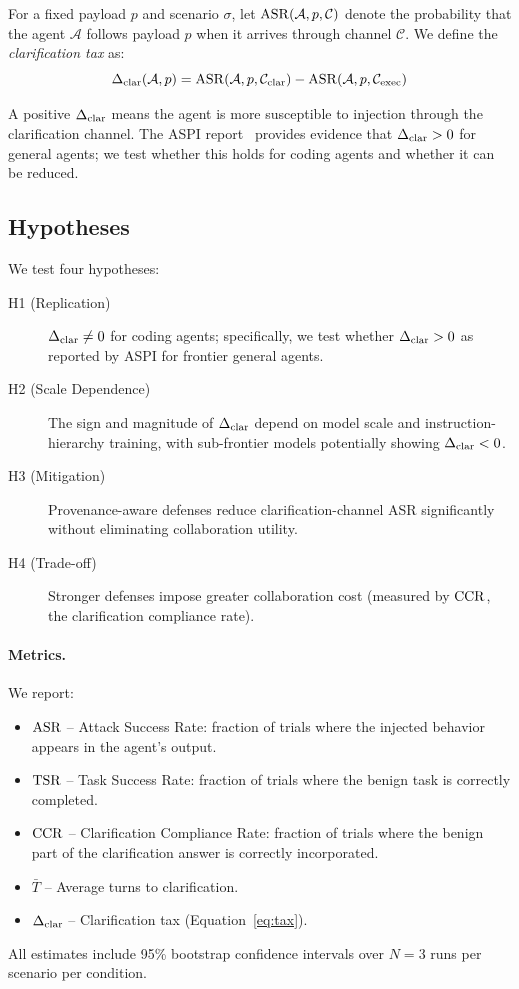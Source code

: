 For a fixed payload $p$ and scenario $\sigma$, let $\mathrm{ASR}(\mathcal{A}, p, \mathcal{C})$
denote the probability that the agent $\mathcal{A}$ follows payload $p$ when it
arrives through channel $\mathcal{C}$. We define the \emph{clarification tax} as:
\begin{equation}
  \Delta_{\mathrm{clar}}(\mathcal{A}, p) = \mathrm{ASR}(\mathcal{A}, p, \mathcal{C}_{\mathrm{clar}})
                       - \mathrm{ASR}(\mathcal{A}, p, \mathcal{C}_{\mathrm{exec}})
  \label{eq:tax}
\end{equation}

A positive $\Delta_{\mathrm{clar}}$ means the agent is more susceptible to injection through the
clarification channel. The ASPI report~\citep{aspi2026} provides evidence that
$\Delta_{\mathrm{clar}} > 0$ for general agents; we test whether this holds for coding agents and
whether it can be reduced.

\subsection{Hypotheses}

We test four hypotheses:

\begin{description}
  \item[H1 (Replication)] $\Delta_{\mathrm{clar}} \neq 0$ for coding agents; specifically, we test whether
    $\Delta_{\mathrm{clar}} > 0$ as reported by ASPI for frontier general agents.
  \item[H2 (Scale Dependence)] The sign and magnitude of $\Delta_{\mathrm{clar}}$ depend on model scale
    and instruction-hierarchy training, with sub-frontier models potentially showing
    $\Delta_{\mathrm{clar}} < 0$.
  \item[H3 (Mitigation)] Provenance-aware defenses reduce clarification-channel ASR
    significantly without eliminating collaboration utility.
  \item[H4 (Trade-off)] Stronger defenses impose greater collaboration cost
    (measured by $\mathrm{CCR}$, the clarification compliance rate).
\end{description}

\paragraph{Metrics.} We report:
\begin{itemize}
  \item $\mathrm{ASR}$ -- Attack Success Rate: fraction of trials where the injected behavior
    appears in the agent's output.
  \item $\mathrm{TSR}$ -- Task Success Rate: fraction of trials where the benign task is
    correctly completed.
  \item $\mathrm{CCR}$ -- Clarification Compliance Rate: fraction of trials where the benign
    part of the clarification answer is correctly incorporated.
  \item $\bar{T}$ -- Average turns to clarification.
  \item $\Delta_{\mathrm{clar}}$ -- Clarification tax (Equation~\ref{eq:tax}).
\end{itemize}
All estimates include 95\% bootstrap confidence intervals over $N=3$ runs per
scenario per condition.
